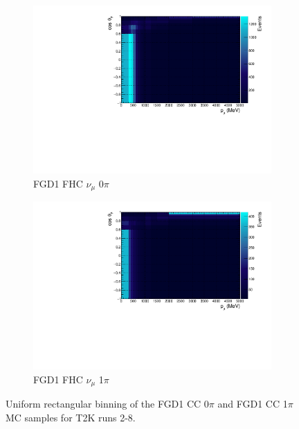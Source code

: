 \begin{figure}
\centering
\begin{subfigure}{.49\textwidth}
  \centering
  \includegraphics[width=0.95\linewidth]{figs/TH2D_MC_FGD1_numuCC_0pi}
  \caption{FGD1 FHC $\nu_{\mu}$ 0$\pi$}
  \label{fig:th2dFGD1_numuCC_0pi}
\end{subfigure}
\begin{subfigure}{.49\textwidth}
  \centering
  \includegraphics[width=0.95\linewidth]{figs/TH2D_MC_FGD1_numuCC_1pi}
  \caption{FGD1 FHC $\nu_{\mu}$ 1$\pi$}
  \label{fig:th2dFGD1_numuCC_1pi}
\end{subfigure}
\caption{Uniform rectangular binning of the FGD1 CC 0$\pi$ and FGD1 CC 1$\pi$ MC samples for T2K runs 2-8.}
\label{fig:th2dbin}
\end{figure}

